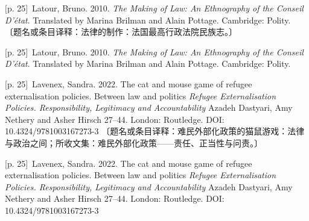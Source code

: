 \documentclass[10pt,a4paper]{article}
\begin{document}
\noindent\begin{minipage}{\textwidth}\begin{minipage}[t]{\dimexpr.5\textwidth-4mm\relax}{\scriptsize\color{gray} [p. 25]}\ Latour, Bruno. 2010. \textit{The Making of Law: An Ethnography of the Conseil D’état}. Translated by Marina Brilman and Alain Pottage. Cambridge: Polity. 〔题名或条目译释：法律的制作：法国最高行政法院民族志。〕\par\end{minipage}\hfill\begin{minipage}[t]{\dimexpr.5\textwidth-4mm\relax}{\scriptsize\color{gray} [p. 25]}\ Latour, Bruno. 2010. \textit{The Making of Law: An Ethnography of the Conseil D’état}. Translated by Marina Brilman and Alain Pottage. Cambridge: Polity.\par\end{minipage}\end{minipage}\par
\noindent\begin{minipage}{\textwidth}\begin{minipage}[t]{\dimexpr.5\textwidth-4mm\relax}{\scriptsize\color{gray} [p. 25]}\ Lavenex, Sandra. 2022. The cat and mouse game of refugee externalisation policies. Between law and politics \textit{Refugee Externalisation Policies. Responsibility, Legitimacy and Accountability} Azadeh Dastyari, Amy Nethery and Asher Hirsch 27–44. London: Routledge. DOI: 10.4324/9781003167273-3 〔题名或条目译释：难民外部化政策的猫鼠游戏：法律与政治之间；所收文集：难民外部化政策——责任、正当性与问责。〕\par\end{minipage}\hfill\begin{minipage}[t]{\dimexpr.5\textwidth-4mm\relax}{\scriptsize\color{gray} [p. 25]}\ Lavenex, Sandra. 2022. The cat and mouse game of refugee externalisation policies. Between law and politics \textit{Refugee Externalisation Policies. Responsibility, Legitimacy and Accountability} Azadeh Dastyari, Amy Nethery and Asher Hirsch 27–44. London: Routledge. DOI: 10.4324/9781003167273-3\par\end{minipage}\end{minipage}\par
\end{document}
